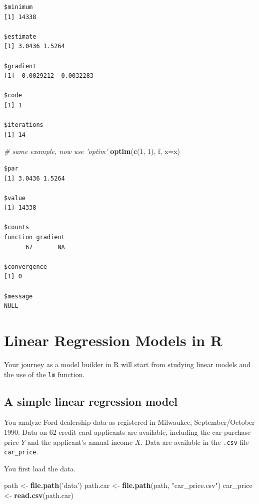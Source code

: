 \documentclass[
]{book}
\newenvironment{Shaded}{\begin{snugshade}}{\end{snugshade}}
\newcommand{\CommentTok}[1]{\textcolor[rgb]{0.56,0.35,0.01}{\textit{#1}}}
\newcommand{\DataTypeTok}[1]{\textcolor[rgb]{0.13,0.29,0.53}{#1}}
\newcommand{\DecValTok}[1]{\textcolor[rgb]{0.00,0.00,0.81}{#1}}
\newcommand{\KeywordTok}[1]{\textcolor[rgb]{0.13,0.29,0.53}{\textbf{#1}}}
\newcommand{\NormalTok}[1]{#1}
\newcommand{\StringTok}[1]{\textcolor[rgb]{0.31,0.60,0.02}{#1}}
\begin{document}
\begin{verbatim}
$minimum
[1] 14338

$estimate
[1] 3.0436 1.5264

$gradient
[1] -0.0029212  0.0032283

$code
[1] 1

$iterations
[1] 14
\end{verbatim}

\begin{Shaded}
\begin{Highlighting}[]
\CommentTok{# same example, now use 'optim'}
\KeywordTok{optim}\NormalTok{(}\KeywordTok{c}\NormalTok{(}\DecValTok{1}\NormalTok{, }\DecValTok{1}\NormalTok{), f, }\DataTypeTok{x=}\NormalTok{x)}
\end{Highlighting}
\end{Shaded}

\begin{verbatim}
$par
[1] 3.0436 1.5264

$value
[1] 14338

$counts
function gradient 
      67       NA 

$convergence
[1] 0

$message
NULL
\end{verbatim}

\hypertarget{lms}{%
\chapter{Linear Regression Models in R}\label{lms}}

Your journey as a model builder in R will start from studying linear models and the use of the \texttt{lm} function.

\hypertarget{a-simple-linear-regression-model}{%
\section{A simple linear regression model}\label{a-simple-linear-regression-model}}

You analyze Ford dealership data as registered in Milwaukee, September/October 1990. Data on 62 credit card applicants are available, including the car purchase price \(Y\) and the applicant's annual income \(X\). Data are available in the \texttt{.csv} file \texttt{car\_price}.

You first load the data.

\begin{Shaded}
\begin{Highlighting}[]
\NormalTok{path <-}\StringTok{ }\KeywordTok{file.path}\NormalTok{(}\StringTok{'data'}\NormalTok{)}
\NormalTok{path.car <-}\StringTok{ }\KeywordTok{file.path}\NormalTok{(path, }\StringTok{"car_price.csv"}\NormalTok{)}
\NormalTok{car_price <-}\StringTok{ }\KeywordTok{read.csv}\NormalTok{(path.car)}
\end{Highlighting}
\end{Shaded}
\end{document}
